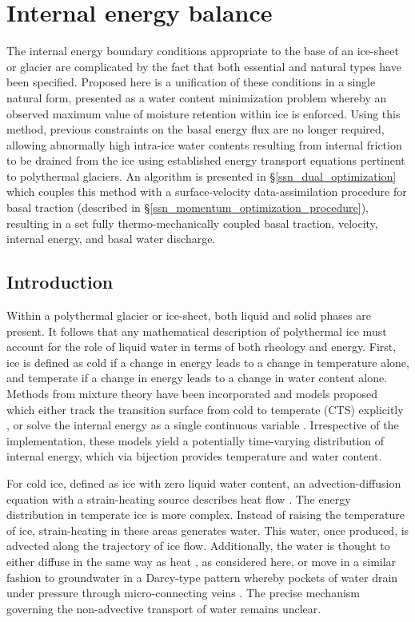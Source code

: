 
\chapter{Internal energy balance} \label{ssn_internal_energy_balance}

The internal energy boundary conditions appropriate to the base of an ice-sheet or glacier are complicated by the fact that both essential and natural types have been specified.  Proposed here is a unification of these conditions in a single natural form, presented as a water content minimization problem whereby an observed maximum value of moisture retention within ice is enforced.  Using this method, previous constraints on the basal energy flux are no longer required, allowing abnormally high intra-ice water contents resulting from internal friction to be drained from the ice using established energy transport equations pertinent to polythermal glaciers.  An algorithm is presented in \S \ref{ssn_dual_optimization} which couples this method with a surface-velocity data-assimilation procedure for basal traction (described in \S \ref{ssn_momentum_optimization_procedure}), resulting in a set fully thermo-mechanically coupled basal traction, velocity, internal energy, and basal water discharge.

\section{Introduction}

Within a polythermal glacier or ice-sheet, both liquid and solid phases are present.  It follows that any mathematical description of polythermal ice must account for the role of liquid water in terms of both rheology and energy.  First, ice is defined as cold if a change in energy leads to a change in temperature alone, and temperate if a change in energy leads to a change in water content alone.  Methods from mixture theory have been incorporated and models proposed which either track the transition surface from cold to temperate  (CTS) explicitly \citep{hutter_1982, greve_1997, greve_2009, blatter_2015}, or solve the internal energy as a single continuous variable \citep{aschwanden_2009, aschwanden_2012}.  Irrespective of the implementation, these models yield a potentially time-varying distribution of internal energy, which via bijection provides temperature and water content.

For cold ice, defined as ice with zero liquid water content, an advection-diffusion equation with a strain-heating source describes heat flow \citep{paterson_1994}. The energy distribution in temperate ice is more complex.  Instead of raising the temperature of ice, strain-heating in these areas generates water.  This water, once produced, is advected along the trajectory of ice flow.  Additionally, the water is thought to either diffuse in the same way as heat \citep{hutter_1982}, as considered here, or move in a similar fashion to groundwater in a Darcy-type pattern whereby pockets of water drain under pressure through micro-connecting veins \citep{fowler_1982}.  The precise mechanism governing the non-advective transport of water remains unclear.


